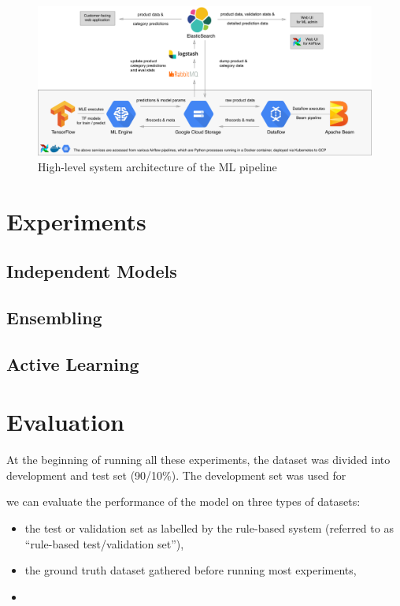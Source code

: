 \begin{figure}
  \hspace*{-0.2\textwidth}
  \includegraphics[width=1.4\textwidth]{diagrams/architecture}
  \caption{High-level system architecture of the ML pipeline}
  \label{arch_diagram}
\end{figure}


\section{Experiments}
\subsection{Independent Models}
\label{exp_models}

\subsection{Ensembling}
\label{exp_ensembling}

\subsection{Active Learning}
\label{exp_al}



\section{Evaluation}
\label{evaluation}

At the beginning of running all these experiments, the dataset was divided into development and test set (90/10\%).
The development set was used for


 we can evaluate the performance of the model on three types of datasets:

\begin{itemize}
  \item the test or validation set as labelled by the rule-based system (referred to as ``rule-based test/validation set''),
  \item the ground truth dataset gathered  before running most experiments,
  \item
\end{itemize}
